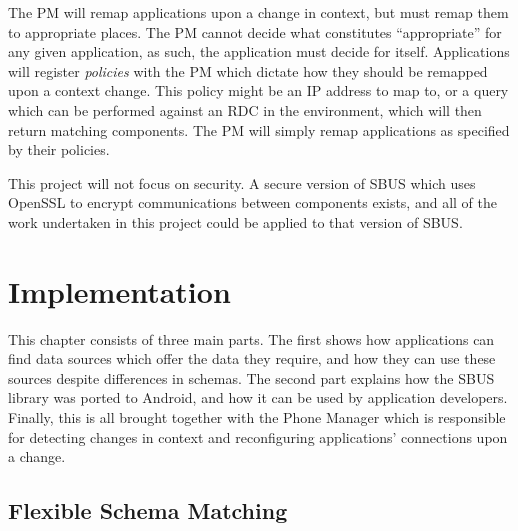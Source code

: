 \documentclass[12pt,twoside,notitlepage]{report}
\begin{document}
The PM will remap applications upon a change in context, but must remap them to appropriate places. 
The PM cannot decide what constitutes ``appropriate'' for any given application, as such, the application must decide for itself. 
Applications will register {\sl policies} with the PM which dictate how they should be remapped upon a context change. 
This policy might be an IP address to map to, or a query which can be performed against an RDC in the environment, which will then return matching components. 
The PM will simply remap applications as specified by their policies.

This project will not focus on security. 
A secure version of SBUS which uses OpenSSL to encrypt communications between components exists, and all of the work undertaken in this project could be applied to that version of SBUS.

\cleardoublepage


\chapter{Implementation}

This chapter consists of three main parts. 
The first shows how applications can find data sources which offer the data they require, and how they can use these sources despite differences in schemas. 
The second part explains how the SBUS library was ported to Android, and how it can be used by application developers. 
Finally, this is all brought together with the Phone Manager which is responsible for detecting changes in context and reconfiguring applications' connections upon a change.

\section{Flexible Schema Matching}
\end{document}
